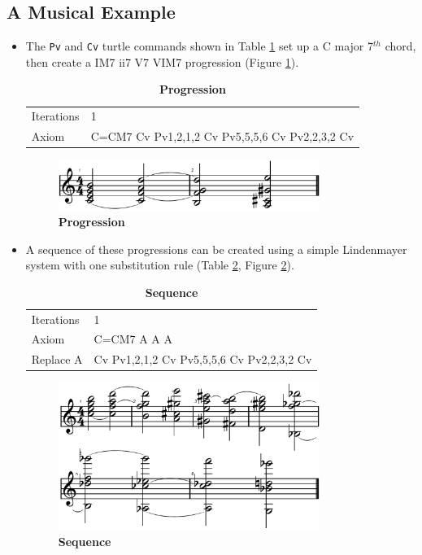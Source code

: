 \documentclass[14pt,letterpaper,onecolumn]{scrartcl}
\begin{document}
\newpage

\subsection{A Musical Example}

\begin{itemize}

\item The \texttt{Pv} and \texttt{Cv} turtle commands shown in Table \ref{tab:progression1} set up a C major 7$^{th}$ chord, then create a IM7 ii7 V7 VIM7 progression (Figure \ref{fig:progression1}). 

\begin{table}[htbp]
\begin{tabular}{l|p{12cm}}
\hline
Iterations & 1\\
Axiom & \ttfamily C=CM7 Cv Pv1,2,1,2 Cv Pv5,5,5,6 Cv Pv2,2,3,2 Cv \\
\hline
\end{tabular}
\caption{\textbf{Progression}}
\label{tab:progression1}
\end{table}

\begin{figure}[htbp]
	\centering
		\includegraphics[width=8.5cm]{progression1}
	\caption{\textbf{Progression}}
	\label{fig:progression1}
\end{figure}

\item A sequence of these progressions can be created using a simple Lindenmayer system with one substitution rule (Table \ref{tab:sequence}, Figure \ref{fig:sequence}). 

\begin{table}[tbp]
\begin{tabular}{l|p{12cm}}
\hline
Iterations & 1\\
Axiom & \ttfamily C=CM7 A A A \\
Replace \ttfamily A & \ttfamily Cv Pv1,2,1,2 Cv Pv5,5,5,6 Cv Pv2,2,3,2 Cv\\
\hline
\end{tabular}
\caption{\textbf{Sequence}}
\label{tab:sequence}
\end{table}

\begin{figure}[htbp]
	\centering
		\includegraphics[width=8.5cm]{sequence}
	\caption{\textbf{Sequence}}
	\label{fig:sequence}
\end{figure}


\end{itemize}
\end{document}
